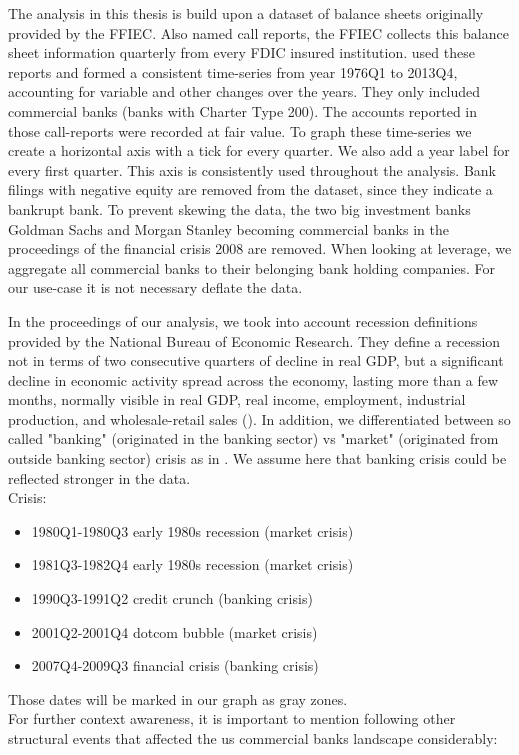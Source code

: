 \documentclass[12pt, a4paper]{article} %
\begin{document}
The analysis in this thesis is build upon a dataset of balance sheets originally provided by the FFIEC. Also named call reports, the FFIEC collects this balance sheet information quarterly from every FDIC insured institution. \cite{DrechslerSchnabel2017} used these reports and formed a consistent time-series from year 1976Q1 to 2013Q4, accounting for variable and other changes over the years. They only included commercial banks (banks with Charter Type 200).
The accounts reported in those call-reports were recorded at fair value. 
To graph these time-series we create a horizontal axis with a tick for every quarter. We also add a year label for every first quarter. This axis is consistently used throughout the analysis. Bank filings with negative equity are removed from the dataset, since they indicate a bankrupt bank. To prevent skewing the data, the two big investment banks Goldman Sachs and Morgan Stanley becoming commercial banks in the proceedings of the financial crisis 2008 are removed. When looking at leverage, we aggregate all commercial banks to their belonging bank holding companies. For our use-case it is not necessary deflate the data.

In the proceedings of our analysis, we took into account recession definitions provided by the National Bureau of Economic Research. They define a recession not in terms of two consecutive quarters of decline in real GDP, but a significant decline in economic activity spread across the economy, lasting more than a few months, normally visible in real GDP, real income, employment, industrial production, and wholesale-retail sales (\cite{NBERBusinessCycles}). In addition, we differentiated between so called "banking" (originated in the banking sector) vs "market" (originated from outside banking sector) crisis as in \cite{BergerBouwman2013}. We assume here that banking crisis could be reflected stronger in the data.\\
Crisis:
\begin{itemize}
\item 1980Q1-1980Q3 early 1980s recession (market crisis)
\item 1981Q3-1982Q4 early 1980s recession (market crisis)
\item 1990Q3-1991Q2 credit crunch (banking crisis)
\item 2001Q2-2001Q4 dotcom bubble (market crisis)
\item 2007Q4-2009Q3 financial crisis (banking crisis)
\end{itemize}
Those dates will be marked in our graph as gray zones.\\
For further context awareness, it is important to mention following other structural events that affected the us commercial banks landscape considerably:
\end{document}
